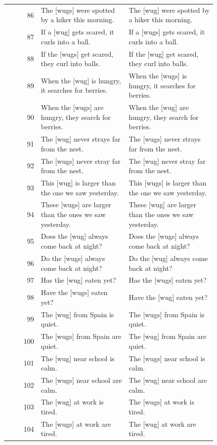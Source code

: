 \begin{longtable}{@{}rp{0.42\linewidth}p{0.42\linewidth}@{}}
86 & The {[}wugs{]} were spotted by a hiker this morning. & The {[}wug{]} were spotted by a hiker this morning. \\
87 & If a {[}wug{]} gets scared, it curls into a ball. & If a {[}wugs{]} gets scared, it curls into a ball. \\
88 & If the {[}wugs{]} get scared, they curl into balls. & If the {[}wug{]} get scared, they curl into balls. \\
89 & When the {[}wug{]} is hungry, it searches for berries. & When the {[}wugs{]} is hungry, it searches for berries. \\
90 & When the {[}wugs{]} are hungry, they search for berries. & When the {[}wug{]} are hungry, they search for berries. \\
91 & The {[}wug{]} never strays far from the nest. & The {[}wugs{]} never strays far from the nest. \\
92 & The {[}wugs{]} never stray far from the nest. & The {[}wug{]} never stray far from the nest. \\
93 & This {[}wug{]} is larger than the one we saw yesterday. & This {[}wugs{]} is larger than the one we saw yesterday. \\
94 & These {[}wugs{]} are larger than the ones we saw yesterday. & These {[}wug{]} are larger than the ones we saw yesterday. \\
95 & Does the {[}wug{]} always come back at night? & Does the {[}wugs{]} always come back at night? \\
96 & Do the {[}wugs{]} always come back at night? & Do the {[}wug{]} always come back at night? \\
97 & Has the {[}wug{]} eaten yet? & Has the {[}wugs{]} eaten yet? \\
98 & Have the {[}wugs{]} eaten yet? & Have the {[}wug{]} eaten yet? \\
99 & The {[}wug{]} from Spain is quiet. & The {[}wugs{]} from Spain is quiet. \\
100 & The {[}wugs{]} from Spain are quiet. & The {[}wug{]} from Spain are quiet. \\
101 & The {[}wug{]} near school is calm. & The {[}wugs{]} near school is calm. \\
102 & The {[}wugs{]} near school are calm. & The {[}wug{]} near school are calm. \\
103 & The {[}wug{]} at work is tired. & The {[}wugs{]} at work is tired. \\
104 & The {[}wugs{]} at work are tired. & The {[}wug{]} at work are tired. \\

\end{longtable}
